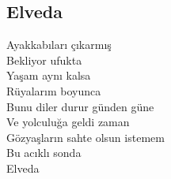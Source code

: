 \subsection{Elveda}

Ayakkabıları çıkarmış \\
Bekliyor ufukta \\
Yaşam aynı kalsa \\
Rüyalarım boyunca \\
Bunu diler durur günden güne \\
Ve yolculuğa geldi zaman \\
Gözyaşların sahte olsun istemem \\
Bu acıklı sonda \\
Elveda \\